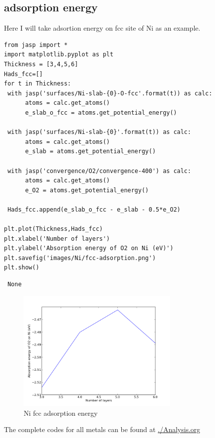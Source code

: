 \documentclass[11pt]{article}
\begin{document}
\subsection{adsorption energy}
\label{sec-3-5}

Here I will take adsortion energy on fcc site of Ni as an example.

\begin{verbatim}
from jasp import *
import matplotlib.pyplot as plt
Thickness = [3,4,5,6]
Hads_fcc=[]
for t in Thickness:
 with jasp('surfaces/Ni-slab-{0}-O-fcc'.format(t)) as calc:
      atoms = calc.get_atoms()
      e_slab_o_fcc = atoms.get_potential_energy()

 with jasp('surfaces/Ni-slab-{0}'.format(t)) as calc:
      atoms = calc.get_atoms()
      e_slab = atoms.get_potential_energy()

 with jasp('convergence/O2/convergence-400') as calc:
      atoms = calc.get_atoms()
      e_O2 = atoms.get_potential_energy()

 Hads_fcc.append(e_slab_o_fcc - e_slab - 0.5*e_O2)

plt.plot(Thickness,Hads_fcc)
plt.xlabel('Number of layers')
plt.ylabel('Absorption energy of O2 on Ni (eV)')
plt.savefig('images/Ni/fcc-adsorption.png')
plt.show()
\end{verbatim}

\begin{verbatim}
 None
\end{verbatim}
\begin{figure}[H]
\centering
\includegraphics[width=0.7\textwidth]{./images/Ni/fcc-adsorption.png}
\caption{Ni fcc adsorption energy}
\end{figure}

The complete codes for all metals can be found at \href{file:///home/yichuns/FinalProject/Analysis.org}{./Analysis.org}
\end{document}

